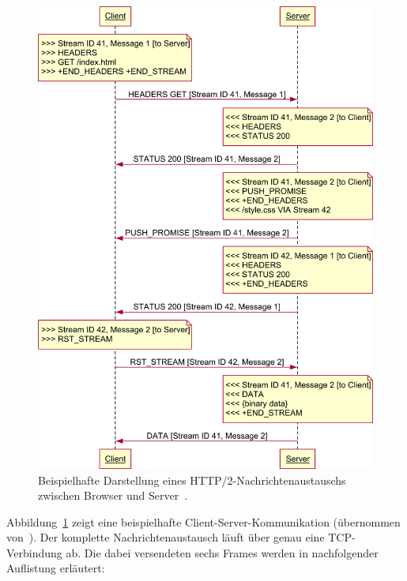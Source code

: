 \documentclass[a4paper, justified, notoc]{tufte-handout} %
\begin{document}
\begin{figure}%
	\centering
  \includegraphics[width=1\textwidth]{./figures/http2_streams.png}
  \caption{Beispielhafte Darstellung eines HTTP/2-Nachrichtenaustauschs zwischen Browser und Server~\citep{weinschenkler:2017}.}
  \label{fig:http2_nachrichtenaustausch}
\end{figure}

Abbildung~\ref{fig:http2_nachrichtenaustausch} zeigt eine beispielhafte Client-Server-Kommunikation (übernommen von~\citep{weinschenkler:2017}). Der komplette Nachrichtenaustausch läuft über genau eine TCP-Verbindung ab. Die dabei versendeten sechs Frames werden in nachfolgender Auflistung erläutert:
\end{document}
